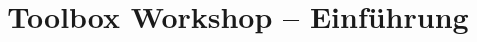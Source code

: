

\title[Intro]{Toolbox Workshop – Einführung}



{
  \begin{frame}
    \titlepage
  \end{frame}
}




